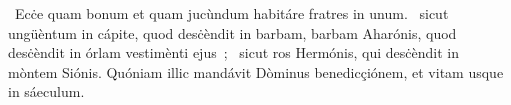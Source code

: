 ~Ecċe quam bonum et quam jucùndum habitáre fratres in unum. 
~sicut ungüèntum in cápite, quod desċèndit in barbam, barbam Aharónis, quod desċèndit in órlam vestimènti ejus~; 
~sicut ros Hermónis, qui desċèndit in mòntem Siónis. Quóniam illic mandávit Dòminus benedicçiónem, et vitam usque in sáeculum. 
